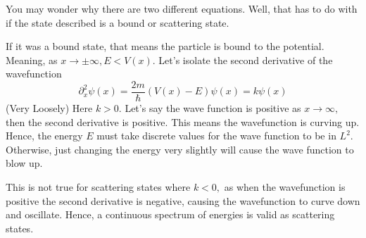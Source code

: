 You may wonder why there are two different equations. Well, that has to do with if the state described is a bound or scattering state.

If it was a bound state, that means the particle is bound to the potential. Meaning, as \(x\to\pm\infty, E<V(x).\) Let's isolate the second derivative of the wavefunction
\begin{equation}
    \partial^2_x\psi(x)=\frac{2m}{\hbar}(V(x)-E)\psi(x)=k\psi(x)
\end{equation}
(Very Loosely) Here \(k>0\). Let's say the wave function is positive as \(x\to\infty,\) then the second derivative is positive. This means the wavefunction is curving up. Hence, the energy \(E\) must take discrete values for the wave function to be in \(L^2.\) Otherwise, just changing the energy very slightly will cause the wave function to blow up.

This is not true for scattering states where \(k<0,\) as when the wavefunction is positive the second derivative is negative, causing the wavefunction to curve down and oscillate. Hence, a continuous spectrum of energies is valid as scattering states.